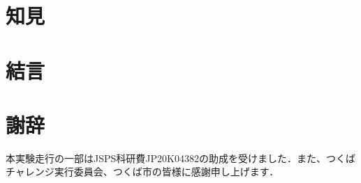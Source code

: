 \documentclass[twocolumn,9pt]{jsproceedings}
\begin{document}
\section{知見}


\section{結言}

\section*{謝辞}

本実験走行の一部はJSPS科研費JP20K04382の助成を受けました．また、つくばチャレンジ実行委員会、つくば市の皆様に感謝申し上げます．

\end{document}
